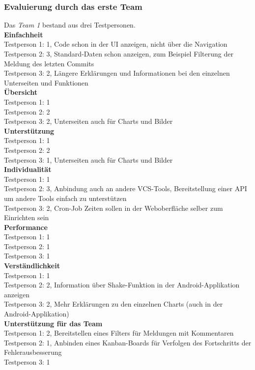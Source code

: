 \subsubsection{Evaluierung durch das erste Team}
Das \textit{Team 1} bestand aus drei Testpersonen. \\
\textbf{Einfachheit} \\
Testperson 1: 1, Code schon in der UI anzeigen, nicht über die Navigation \\
Testperson 2: 3, Standard-Daten schon anzeigen, zum Beispiel Filterung der Meldung des letzten Commits \\
Testperson 3: 2, Längere Erklärungen und Informationen bei den einzelnen Unterseiten und Funktionen \\
\textbf{Übersicht} \\
Testperson 1: 1 \\
Testperson 2: 2 \\
Testperson 3: 2, Unterseiten auch für Charts und Bilder \\
\textbf{Unterstützung} \\
Testperson 1: 1 \\
Testperson 2: 2 \\
Testperson 3: 1, Unterseiten auch für Charts und Bilder \\
\textbf{Individualität} \\
Testperson 1: 1 \\
Testperson 2: 3, Anbindung auch an andere VCS-Tools, Bereitstellung einer API um andere Tools einfach zu unterstützen \\
Testperson 3: 2, Cron-Job Zeiten sollen in der Weboberfläche selber zum Einrichten sein\\
\textbf{Performance} \\
Testperson 1: 1 \\
Testperson 2: 1 \\
Testperson 3: 1 \\
\textbf{Verständlichkeit} \\
Testperson 1: 1 \\
Testperson 2: 2, Information über Shake-Funktion in der Android-Applikation anzeigen \\
Testperson 3: 2, Mehr Erklärungen zu den einzelnen Charts (auch in der Android-Applikation) \\
\textbf{Unterstützung für das Team} \\
Testperson 1: 2, Bereitstellen eines Filters für Meldungen mit Kommentaren \\
Testperson 2: 1, Anbinden eines Kanban-Boards für Verfolgen des Fortschritts der Fehlerausbesserung \\
Testperson 3: 1 \\
